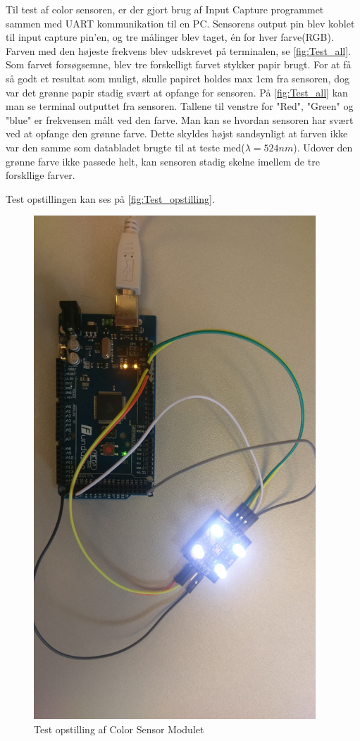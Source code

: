 Til test af color sensoren, er der gjort brug af Input Capture programmet sammen med UART kommunikation til en PC. Sensorens output pin blev koblet til input capture pin'en, og tre målinger blev taget, én for hver farve(RGB). Farven med den højeste frekvens blev udskrevet på terminalen, se \autoref{fig:Test_all}. Som farvet forsøgsemne, blev tre forskelligt farvet stykker papir brugt. For at få så godt et resultat som muligt, skulle papiret holdes max 1cm fra sensoren, dog var det grønne papir stadig svært at opfange for sensoren. På \autoref{fig:Test_all} kan man se terminal outputtet fra sensoren. Tallene til venstre for "Red", "Green" og "blue" er frekvensen målt ved den farve. Man kan se hvordan sensoren har svært ved at opfange den grønne farve. Dette skyldes højst sandsynligt at farven ikke var den samme som databladet brugte til at teste med($\lambda = 524 nm$)\cite{man:TC3200}. Udover den grønne farve ikke passede helt, kan sensoren stadig skelne imellem de tre forskllige farver. 

Test opstillingen kan ses på \autoref{fig:Test_opstilling}.

\begin{figure}[H]
	\centering
	\includegraphics[width = 300pt]{Img/TestOpstilling.jpg}
	\caption{Test opstilling af Color Sensor Modulet}
	\label{fig:Test_opstilling}
\end{figure}


